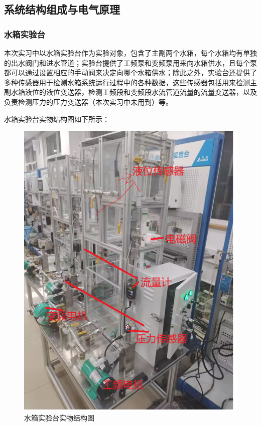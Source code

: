 \documentclass[UTF8]{article}
\begin{document}
\subsection{系统结构组成与电气原理}
\subsubsection{水箱实验台}
本次实习中以水箱实验台作为实验对象，包含了主副两个水箱，每个水箱均有单独的出水阀门和进水管道；实验台提供了工频泵和变频泵用来向水箱供水，且每个泵都可以通过设置相应的手动阀来决定向哪个水箱供水；除此之外，实验台还提供了多种传感器用于检测水箱系统运行过程中的各种数据，这些传感器包括用来检测主副水箱液位的液位变送器，检测工频段和变频段水流管道流量的流量变送器，以及负责检测压力的压力变送器（本次实习中未用到）等。

水箱实验台实物结构图如下所示：
\begin{figure}[H]
    \centering %
    \includegraphics[width=.6\textwidth]{figure/水箱实验台实物结构图.png} 
    \caption{水箱实验台实物结构图} %
\end{figure}

\end{document}
